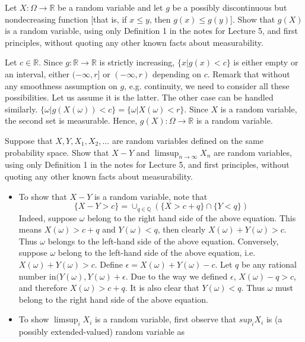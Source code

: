 \documentclass[a4paper, 12pt]{exam}
\begin{document}
\begin{questions}
\question Let $X: \Omega \rightarrow \mathbb{R}$ be a random variable and let $g$ be a possibly discontinuous but nondecreasing function [that is, if $x\le y$, then $g(x) \le g(y)$]. Show that $g(X)$ is a random variable, using only Definition 1 in the notes for Lecture 5, and first principles, without quoting any other known facts about measurability.
\begin{solution}
	Let $c \in \mathbb{R}$. Since $g : \mathbb{R} \rightarrow \mathbb{R}$ is strictly increasing, $\{x|g(x) < c\}$ is either empty or an interval, either $(-\infty,r]$ or $(-\infty,r)$ depending on $c$. Remark that without any smoothness assumption on $g$, e.g. continuity, we need to consider all these possibilities. Let us assume it is the latter. The other case can be handled similarly.
	$\{\omega|g(X(\omega)) <c\} = \{\omega|X(\omega) <r\}$. Since $X$ is a random variable, the second set is measurable.
    Hence, $g(X): \Omega \rightarrow \mathbb{R}$ is a random variable.
\end{solution}
\question Suppose that $X, Y, X_1, X_2, \dots$ are random variables defined on the same probability space. Show that $X-Y$ and $\limsup_{n \rightarrow \infty} X_n$ are random variables, using only Definition 1 in the notes for Lecture 5, and first principles, without quoting any other known facts about measurability.
\begin{solution}
	\begin{itemize}
		\item To show that $X - Y$ is a random variable, note that
		\begin{equation*}
	        \{X - Y >c\} = \cup_{q\in \mathbb{Q}}\left(\{X>c + q\}\cap\{Y <q\}\right)
		\end{equation*}
		Indeed, suppose $\omega$ belong to the right hand side of the above equation. This means $X(\omega) >c+q$ and $Y (\omega) <q$, then clearly $X(\omega)+Y (\omega) >c$. Thus $\omega$ belongs to the left-hand side of the above equation.
		Conversely, suppose $\omega$ belong to the left-hand side of the above equation, i.e. $X(\omega)+Y (\omega) >c$. Define $\epsilon= X(\omega)+Y(\omega)-c$. Let $q$ be any rational number in$ (Y (\omega),Y (\omega)+\epsilon$. Due to the way we defined $\epsilon$, $X(\omega)-q>c$, and therefore $X(\omega) >c + q$. It is also clear that $Y(\omega) <q$. Thus $\omega$ must belong to the right hand side of the above equation.
		\item To show $\limsup_i X_i$ is a random variable, first observe that $sup_i X_i$ is (a possibly extended-valued) random variable as

\end{itemize}
\end{solution}
\end{questions}
\end{document}
